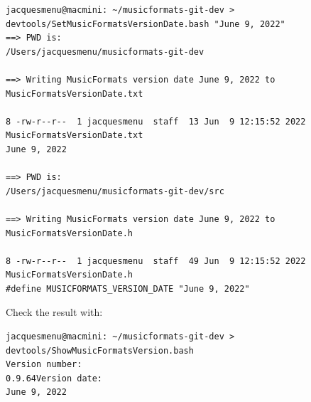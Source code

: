 \begin{enumerate}
\begin{lstlisting}[language=Terminal]
jacquesmenu@macmini: ~/musicformats-git-dev > devtools/SetMusicFormatsVersionDate.bash "June 9, 2022"
==> PWD is:
/Users/jacquesmenu/musicformats-git-dev

==> Writing MusicFormats version date June 9, 2022 to MusicFormatsVersionDate.txt

8 -rw-r--r--  1 jacquesmenu  staff  13 Jun  9 12:15:52 2022 MusicFormatsVersionDate.txt
June 9, 2022

==> PWD is:
/Users/jacquesmenu/musicformats-git-dev/src

==> Writing MusicFormats version date June 9, 2022 to MusicFormatsVersionDate.h

8 -rw-r--r--  1 jacquesmenu  staff  49 Jun  9 12:15:52 2022 MusicFormatsVersionDate.h
#define MUSICFORMATS_VERSION_DATE "June 9, 2022"
\end{lstlisting}

Check the result with:
\begin{lstlisting}[language=Terminal]
jacquesmenu@macmini: ~/musicformats-git-dev > devtools/ShowMusicFormatsVersion.bash
Version number:
0.9.64Version date:
June 9, 2022
\end{lstlisting}

\end{enumerate}
